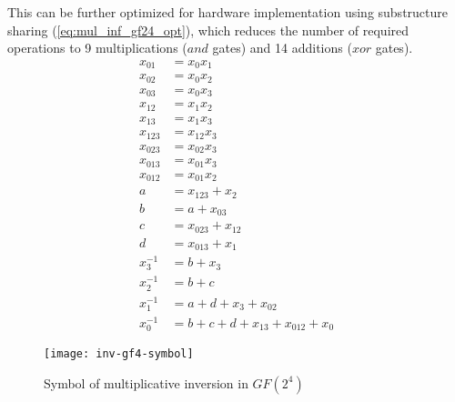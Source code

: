 This can be further optimized for hardware implementation using substructure sharing (\ref{eq:mul_inf_gf24_opt}), which reduces the number of required operations to 9 multiplications ($and$ gates) and 14 additions ($xor$ gates).
\begin{equation}
\label{eq:mul_inf_gf24_opt}
\begin{aligned}
x_{01}   &= x_0x_1                             \\
x_{02}   &= x_0x_2                             \\
x_{03}   &= x_0x_3                             \\
x_{12}   &= x_1x_2                             \\
x_{13}   &= x_1x_3                             \\
x_{123}  &= x_{12}x_3                          \\
x_{023}  &= x_{02}x_3                          \\
x_{013}  &= x_{01}x_3                          \\
x_{012}  &= x_{01}x_2                          \\
a        &= x_{123} + x_2                      \\
b        &= a + x_{03}                         \\
c        &= x_{023} + x_{12}                   \\
d        &= x_{013} + x_{1}                    \\
x_3^{-1} &= b + x_3                            \\
x_2^{-1} &= b + c                              \\
x_1^{-1} &= a + d + x_3 + x_{02}               \\
x_0^{-1} &= b + c + d + x_{13} + x_{012} + x_0
\end{aligned}
\end{equation}

\begin{figure}[!h]
\centering
\texttt{[image: inv-gf4-symbol]}
\caption{Symbol of multiplicative inversion in $GF(2^4)$}
\label{fig:mul_inv_gf4_symbol}
\end{figure}






